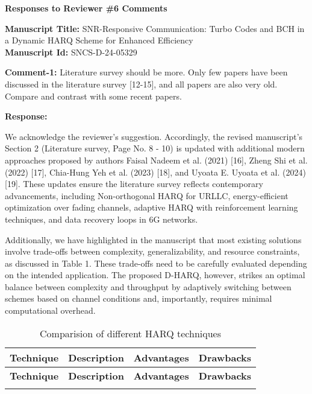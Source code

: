 \documentclass[a4paper,10pt]{article}
\begin{document}
\newpage



\noindent \textbf{Responses to  Reviewer \#6 Comments}

\vspace{0.25in}

\noindent \textbf{Manuscript Title:} SNR-Responsive Communication: Turbo Codes and BCH in a Dynamic HARQ Scheme for Enhanced Efficiency \\

\noindent \textbf{Manuscript Id:} SNCS-D-24-05329 \\

\begin{enumerate}

{\color{blue} \item \textbf{Comment-1:} Literature survey should be more. Only few papers have been discussed in the literature survey [12-15], and all papers are also very old. Compare and contrast with some recent papers.} 

\textbf{Response:} 

We acknowledge the reviewer’s suggestion. Accordingly, the revised manuscript’s Section 2 (Literature survey, Page No. 8 - 10) is updated with additional modern approaches proposed by authors Faisal Nadeem et al. (2021) [16], Zheng Shi et al. (2022) [17], Chia-Hung Yeh et al. (2023) [18], and Uyoata E. Uyoata et al. (2024) [19]. These updates ensure the literature survey reflects contemporary advancements, including Non-orthogonal HARQ for URLLC, energy-efficient optimization over fading channels, adaptive HARQ with reinforcement learning techniques, and data recovery loops in 6G networks.


Additionally, we have highlighted in the manuscript that most existing solutions involve trade-offs between complexity, generalizability, and resource constraints, as discussed in Table 1. These trade-offs need to be carefully evaluated depending on the intended application. The proposed D-HARQ, however, strikes an optimal balance between complexity and throughput by adaptively switching between schemes based on channel conditions and, importantly, requires minimal computational overhead.


\setlength{\tabcolsep}{4pt}
\setlength{\extrarowheight}{-2pt} %
\renewcommand{\arraystretch}{0.5}

\begin{longtable}{|>{\centering\arraybackslash}m{3.2cm}|>{\centering\arraybackslash}m{4.3cm}|>{\centering\arraybackslash}m{3.75cm}|>{\centering\arraybackslash}m{3.75cm}|}
\caption{Comparision of different HARQ techniques} \label{tab:3} \\ \hline
\textbf{Technique} & \textbf{Description} & \textbf{Advantages} & \textbf{Drawbacks} \\ 
\hline
\endfirsthead
\hline
\textbf{Technique} & \textbf{Description} & \textbf{Advantages} & \textbf{Drawbacks} \\ 
\hline
\endhead
\hline
\endfoot


\end{longtable}
\end{enumerate}
\end{document}
